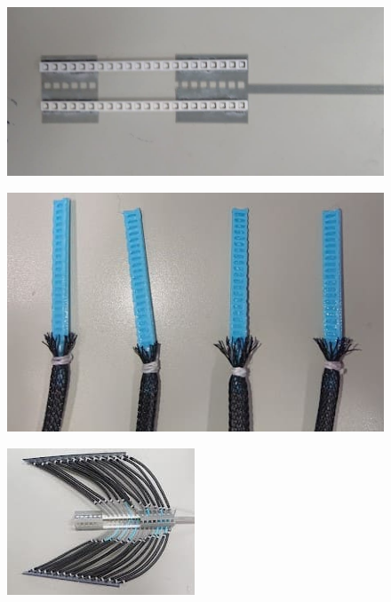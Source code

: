 \begin{figure}[t]
  \begin{minipage}{0.5\hsize}
    \centering
    \includegraphics[scale=0.2]{image/ken.JPG}
    \label{fig:jken}
  \end{minipage}
  \begin{minipage}{0.5\hsize}
    \centering
    \includegraphics[scale=0.3]{image/MPA_tanbu.JPG}
    \label{fig:jtanbu}
  \end{minipage}
  \begin{minipage}{0.5\hsize}
    \vspace{3mm}
    \centering
    \includegraphics[scale=0.6]{image/syuseki.JPG}
    \label{fig:jsyuseki}

\end{minipage}
\end{figure}
